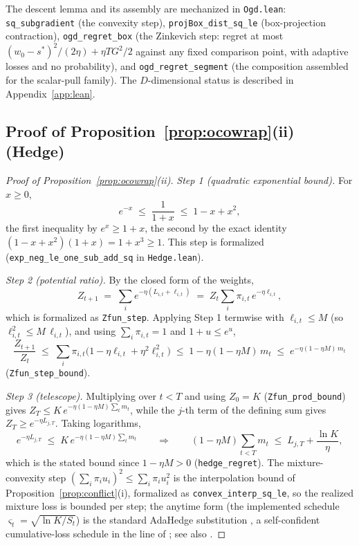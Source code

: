 \begin{remark}
The descent lemma and its assembly are mechanized in \texttt{Ogd.lean}:
\texttt{sq\_subgradient} (the convexity step),
\texttt{projBox\_dist\_sq\_le} (box-projection contraction),
\texttt{ogd\_regret\_box} (the Zinkevich step: regret at most $(w_0 - s^*)^2/(2\eta) + \eta T G^2/2$ against any fixed comparison point, with adaptive losses and no probability),
and \texttt{ogd\_regret\_segment} (the composition assembled for the scalar-pull family).
The $D$-dimensional status is described in Appendix~\ref{app:lean}.
\end{remark}

\subsection{Proof of Proposition~\ref{prop:ocowrap}(ii) (Hedge)}
\label{app:proof-hedge}



\begin{proof}[Proof of Proposition~\ref{prop:ocowrap}(ii)]
\emph{Step 1 (quadratic exponential bound).}
For $x \ge 0$,
\[
  e^{-x} \;\le\; \frac{1}{1+x} \;\le\; 1 - x + x^2,
\]
the first inequality by $e^x \ge 1 + x$, the second by the exact identity $(1 - x + x^2)(1 + x) = 1 + x^3 \ge 1$.
This step is formalized (\texttt{exp\_neg\_le\_one\_sub\_add\_sq} in \texttt{Hedge.lean}).

\emph{Step 2 (potential ratio).}
By the closed form of the weights,
\[
  Z_{t+1}
  \;=\; \sum_i e^{-\eta(L_{i,t} + \ell_{i,t})}
  \;=\; Z_t \sum_i \pi_{i,t}\, e^{-\eta \ell_{i,t}} ,
\]
which is formalized as \texttt{Zfun\_step}.
Applying Step 1 termwise with $\ell_{i,t} \le M$ (so $\ell_{i,t}^2 \le M\,\ell_{i,t}$), and using $\sum_i \pi_{i,t} = 1$ and $1 + u \le e^u$,
\[
  \frac{Z_{t+1}}{Z_t}
  \;\le\; \sum_i \pi_{i,t}\bigl(1 - \eta \ell_{i,t} + \eta^2 \ell_{i,t}^2\bigr)
  \;\le\; 1 - \eta(1 - \eta M)\,m_t
  \;\le\; e^{-\eta(1 - \eta M)\,m_t}
\]
(\texttt{Zfun\_step\_bound}).

\emph{Step 3 (telescope).}
Multiplying over $t < T$ and using $Z_0 = K$ (\texttt{Zfun\_prod\_bound}) gives
$Z_T \le K\, e^{-\eta(1 - \eta M)\sum_t m_t}$, while the $j$-th term of the defining sum gives $Z_T \ge e^{-\eta L_{j,T}}$.
Taking logarithms,
\[
  e^{-\eta L_{j,T}}
  \;\le\; K\, e^{-\eta(1 - \eta M)\sum_t m_t}
  \qquad\Longrightarrow\qquad
  (1 - \eta M)\sum_{t < T} m_t \;\le\; L_{j,T} + \frac{\ln K}{\eta},
\]
which is the stated bound since $1 - \eta M > 0$ (\texttt{hedge\_regret}).
The mixture-convexity step $(\sum_i \pi_i u_i)^2 \le \sum_i \pi_i u_i^2$ is the interpolation bound of Proposition~\ref{prop:conflict}(i), formalized as \texttt{convex\_interp\_sq\_le}, so the realized mixture loss is bounded per step; the anytime form (the implemented schedule $\varsigma_t = \sqrt{\ln K / S_t}$) is the standard AdaHedge substitution \citep{rooij2014}, a self-confident cumulative-loss schedule in the line of \citet{auer2002}; see also \citet{cesabianchi2006}.
\end{proof}

